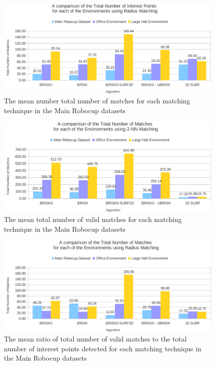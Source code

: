 \documentclass[11pt]{report}
\begin{document}
\begin{figure}
  \centering
    \includegraphics[width=1.0\textwidth]{../Drawings/Graphs/overall_tn_ip_radius.pdf}
    \caption{The mean number total number of matches for each matching technique in the Main Robocup datasets} 
    \label{fig:overall_tn_ip_radius}
\end{figure}

\begin{figure}
  \centering
    \includegraphics[width=1.0\textwidth]{../Drawings/Graphs/overall_tnm.pdf}
    \caption{The mean total number of valid matches for each matching technique in the Main Robocup datasets} 
    \label{fig:overall_tnm}
\end{figure}

\begin{figure}
  \centering
    \includegraphics[width=1.0\textwidth]{../Drawings/Graphs/overall_tnm_radius.pdf}
    \caption{The mean ratio of total number of valid matches to the total number of interest points detected for each matching technique in the Main Robocup datasets} 
    \label{fig:overall_tnm_radius}
\end{figure}
\end{document}
